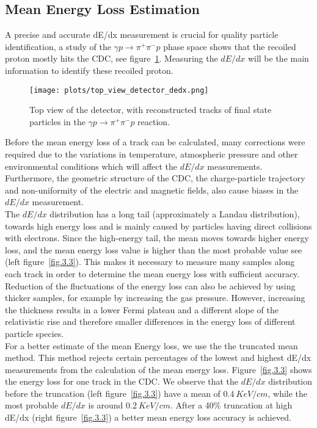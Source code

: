 \subsection{Mean Energy Loss Estimation}
A precise and accurate dE/dx measurement is crucial for quality particle identification, a study of the $\gamma p \rightarrow \pi^{+} \pi^{-} p$ phase space shows that the recoiled proton mostly hits the CDC, see figure~\ref{fig.3.2}.
Measuring the $dE/dx$ will be the main information to identify these recoiled proton.
\begin{figure}[h]
    \centering
    \texttt{[image: plots/top\_view\_detector\_dedx.png]}
    \caption{\label{fig.3.2}Top view of the detector, with reconstructed tracks of final state particles in the $\gamma p \rightarrow \pi^{+} \pi^{-} p$ reaction.}
\end{figure}
Before the mean energy loss of a track can be calculated, many corrections were required due to the variations in temperature, atmospheric pressure and other environmental conditions which will affect the $dE/dx$ measurements. Furthermore, the geometric structure of the CDC, the charge-particle trajectory and non-uniformity of the electric and magnetic fields, also cause biases in the $dE/dx$ measurement.\\
The $dE/dx$ distribution has a long tail (approximately a Landau distribution), towards high energy loss and is mainly caused by particles having direct collisions with electrons. Since the high-energy tail, the mean moves towards higher energy loss, and the mean energy loss value is higher than the most probable value see (left figure~\ref{fig.3.3}). This makes it necessary to measure many samples along each track in order to determine the mean energy loss with sufficient accuracy. Reduction of the fluctuations of the energy loss can also be achieved by using thicker samples, for example by increasing the gas pressure. However, increasing the thickness results in a lower Fermi plateau and a different slope of the relativistic rise and therefore smaller differences in the energy loss of different particle species.\\
For a better estimate of the mean Energy loss, we use the the truncated mean method. This method rejects certain percentages of the lowest and highest dE/dx measurements from the calculation of the mean energy loss. Figure~\ref{fig.3.3} shows the energy loss for one track in the CDC. We observe that the $dE/dx$ distribution before the truncation (left figure~\ref{fig.3.3}) have a mean of $0.4~KeV/cm$, while the most probable $dE/dx$ is around $0.2~KeV/cm$. After a 40$\%$ truncation at high dE/dx (right figure~\ref{fig.3.3}) a better mean energy loss accuracy is achieved.
